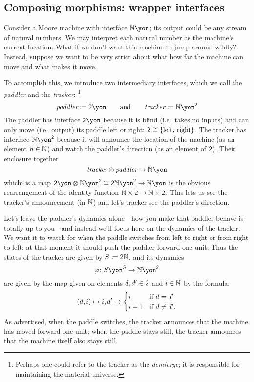 \documentclass[Book-Poly]{subfiles}
\begin{document}
\subsection{Composing morphisms: wrapper interfaces} %

\begin{example}[Paddling]\label{ex.paddler}
Consider a Moore machine with interface $\nn\yon$; its output could be any stream of natural numbers.
We may interpret each natural number as the machine's current location.
What if we don't want this machine to jump around wildly?
Instead, suppose we want to be very strict about what how far the machine can move and what makes it move.

To accomplish this, we introduce two intermediary interfaces, which we call the \emph{paddler} and the \emph{tracker}:%
\footnote{Perhaps one could refer to the tracker as the \emph{demiurge}; it is responsible for maintaining the material universe.}
\[
  \textit{paddler}\coloneqq\2\yon
  \qqand
  \textit{tracker}\coloneqq\nn\yon^\2
\]
The paddler has interface $\2\yon$ because it is blind (i.e.\ takes no inputs) and can only move (i.e.\ output) its paddle left or right: $\textsf{2}\cong\{\text{left, right}\}$. The tracker has interface $\nn\yon^\2$ because it will announce the location of the machine (as an element $n\in\mathbb{N}$) and watch the paddler's direction (as an element of $\textsf{2}$). Their enclosure together
\[
\textit{tracker}\otimes\textit{paddler}\to\nn\yon
\]
whichi is a map $\2\yon\otimes\nn\yon^\2\cong\2\nn\yon^\2\to\nn\yon$ is the obvious rearrangement of the identity function $\mathbb{N}\times\textsf{2}\to\mathbb{N}\times\textsf{2}$. This lets us see the tracker's announcement (in $\mathbb{N}$) and let's tracker see the paddler's direction.

Let's leave the paddler's dynamics alone---how you make that paddler behave is totally up to you---and instead we'll focus here on the dynamics of the tracker. We want it to watch for when the paddle switches from left to right or from right to left; at that moment it should push the paddler forward one unit. Thus the states of the tracker are given by $S\coloneqq\textsf{2}\mathbb{N}$, and its dynamics
\[\varphi\colon S\yon^S\to\nn\yon^\2\]
are given by the map given on elements $d,d'\in\textsf{2}$ and $i\in\mathbb{N}$ by the formula:
\[
  (d,i)\mapsto i,d'\mapsto
	\begin{cases}
		i&\textnormal{if }d=d'\\
		i+1&\textnormal{if }d\neq d'.
	\end{cases}
\]
As advertised, when the paddle switches, the tracker announces that the machine has moved forward one unit; when the paddle stays still, the tracker announces that the machine itself also stays still.
\end{example}
\end{document}
